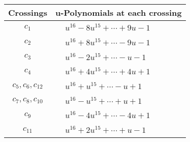 \documentclass[1p]{elsarticle_modified}
\theoremstyle{definition}
\begin{document}
\begin{tabular}{m{50pt}|m{274pt}}
Crossings & \hspace{64pt}u-Polynomials at each crossing \\
\hline $$\begin{aligned}c_{1}\end{aligned}$$&$\begin{aligned}
&u^{16}-8 u^{15}+\cdots+9 u-1
\end{aligned}$\\
\hline $$\begin{aligned}c_{2}\end{aligned}$$&$\begin{aligned}
&u^{16}+8 u^{15}+\cdots-9 u-1
\end{aligned}$\\
\hline $$\begin{aligned}c_{3}\end{aligned}$$&$\begin{aligned}
&u^{16}-2 u^{15}+\cdots- u-1
\end{aligned}$\\
\hline $$\begin{aligned}c_{4}\end{aligned}$$&$\begin{aligned}
&u^{16}+4 u^{15}+\cdots+4 u+1
\end{aligned}$\\
\hline $$\begin{aligned}c_{5},c_{6},c_{12}\end{aligned}$$&$\begin{aligned}
&u^{16}+u^{15}+\cdots- u+1
\end{aligned}$\\
\hline $$\begin{aligned}c_{7},c_{8},c_{10}\end{aligned}$$&$\begin{aligned}
&u^{16}- u^{15}+\cdots+u+1
\end{aligned}$\\
\hline $$\begin{aligned}c_{9}\end{aligned}$$&$\begin{aligned}
&u^{16}-4 u^{15}+\cdots-4 u+1
\end{aligned}$\\
\hline $$\begin{aligned}c_{11}\end{aligned}$$&$\begin{aligned}
&u^{16}+2 u^{15}+\cdots+u-1
\end{aligned}$\\
\hline
\end{tabular}\\~\\
\end{document}
